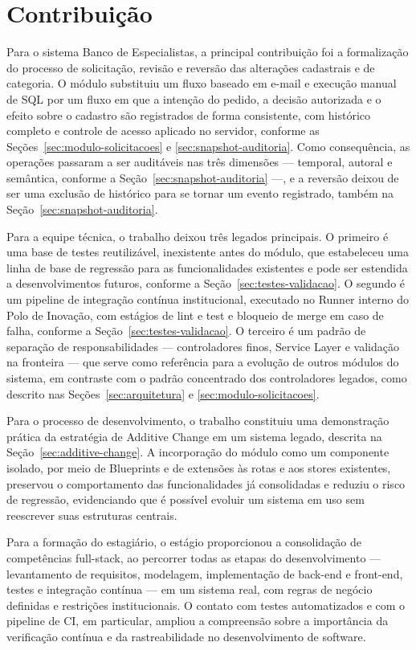 \section{Contribuição}
\label{sec:contribuicao}

Para o sistema Banco de Especialistas, a principal contribuição foi a formalização 
do processo de solicitação, revisão e reversão das alterações cadastrais e de 
categoria. O módulo substituiu um fluxo baseado em e-mail e execução manual de 
SQL por um fluxo em que a intenção do pedido, a decisão autorizada e o efeito sobre o 
cadastro são registrados de forma consistente, com histórico completo e controle de 
acesso aplicado no servidor, conforme as Seções~\ref{sec:modulo-solicitacoes} e \ref{sec:snapshot-auditoria}. Como consequência, as operações 
passaram a ser auditáveis nas três dimensões — temporal, autoral e 
semântica, conforme a Seção~\ref{sec:snapshot-auditoria} —, e a reversão deixou de ser uma exclusão de histórico 
para se tornar um evento registrado, também na Seção~\ref{sec:snapshot-auditoria}.

Para a equipe técnica, o trabalho deixou três legados principais. O primeiro 
é uma base de testes reutilizável, inexistente antes do módulo, que estabeleceu uma 
linha de base de regressão para as funcionalidades existentes e pode ser estendida a 
desenvolvimentos futuros, conforme a Seção~\ref{sec:testes-validacao}. O segundo é um pipeline de integração contínua 
institucional, executado no Runner interno do Polo de Inovação, com estágios de lint 
e test e bloqueio de merge em caso de falha, conforme a Seção~\ref{sec:testes-validacao}. O terceiro é um padrão de 
separação de responsabilidades — controladores finos, Service Layer e validação na 
fronteira — que serve como referência para a evolução de outros módulos do sistema, 
em contraste com o padrão concentrado dos controladores legados, como descrito nas Seções~\ref{sec:arquitetura} e \ref{sec:modulo-solicitacoes}.

Para o processo de desenvolvimento, o trabalho constituiu uma demonstração prática da 
estratégia de Additive Change em um sistema legado, descrita na Seção~\ref{sec:additive-change}. A incorporação do módulo 
como um componente isolado, por meio de Blueprints e de extensões às rotas e aos stores 
existentes, preservou o comportamento das funcionalidades já consolidadas e reduziu o 
risco de regressão, evidenciando que é possível evoluir um sistema em uso sem reescrever suas estruturas centrais.

Para a formação do estagiário, o estágio proporcionou a consolidação de competências 
full-stack, ao percorrer todas as etapas do desenvolvimento — levantamento de requisitos, 
modelagem, implementação de back-end e front-end, testes e integração contínua — em um 
sistema real, com regras de negócio definidas e restrições institucionais. O contato 
com testes automatizados e com o pipeline de CI, em particular, ampliou a compreensão 
sobre a importância da verificação contínua e da rastreabilidade no desenvolvimento de software.